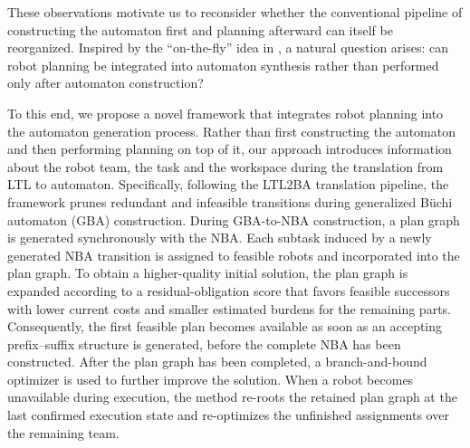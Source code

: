 \documentclass[lettersize,journal]{IEEEtran}
\theoremstyle{italiclemma}
\theoremstyle{italiclemma}
\theoremstyle{definition}
\begin{document}

These observations motivate us to reconsider whether the conventional pipeline of constructing the automaton first and planning afterward can itself be reorganized.
Inspired by the ``on-the-fly'' idea in \cite{Gastin2001FastLT}, a natural question arises: can robot planning be integrated into automaton synthesis rather than performed only after automaton construction?
 
To this end, we propose a novel framework that integrates robot planning into the automaton generation process. Rather than first constructing the automaton and then performing planning on top of it, our approach introduces information about the robot team, the task and the workspace during the translation from LTL to automaton. Specifically, following the LTL2BA\cite{Gastin2001FastLT} translation pipeline, the framework prunes redundant and infeasible transitions during generalized Büchi automaton (GBA) construction. 
During GBA-to-NBA construction, a plan graph is generated synchronously with the NBA. Each subtask induced by a newly generated NBA transition is  assigned to feasible robots and incorporated into the plan graph. To obtain a higher-quality initial solution, the plan graph is expanded according to a residual-obligation score that favors feasible successors with lower current costs and smaller estimated burdens for the remaining parts. Consequently, the first feasible plan becomes available as soon as an accepting prefix--suffix structure is generated, before the complete NBA has been constructed. After the plan graph has been completed, a branch-and-bound optimizer is used to further improve the solution.  When a robot becomes unavailable during execution, the method re-roots the retained plan graph at the last confirmed execution state and re-optimizes the unfinished assignments over the remaining team. 
\end{document}
